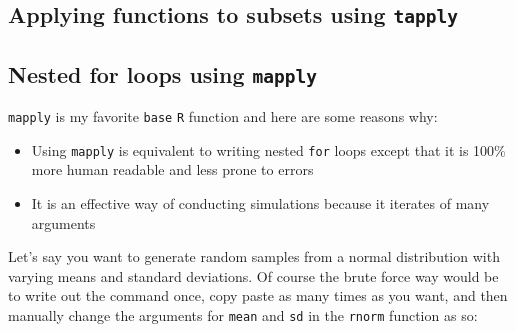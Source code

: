 \documentclass[]{book}
\makeatletter
\newenvironment{Shaded}{\begin{snugshade}}{\end{snugshade}}
\newcommand{\KeywordTok}[1]{\textcolor[rgb]{0.13,0.29,0.53}{\textbf{#1}}}
\newcommand{\CommentTok}[1]{\textcolor[rgb]{0.56,0.35,0.01}{\textit{#1}}}
\newcommand{\OperatorTok}[1]{\textcolor[rgb]{0.81,0.36,0.00}{\textbf{#1}}}
\newcommand{\NormalTok}[1]{#1}
\providecommand{\tightlist}{%
  \setlength{\itemsep}{0pt}\setlength{\parskip}{0pt}}
\providecommand{\tightlist}{%
  \setlength{\itemsep}{0pt}\setlength{\parskip}{0pt}}
\newenvironment{kframe}{%
\medskip{}
\setlength{\fboxsep}{.8em}
 \def\at@end@of@kframe{}%
 \ifinner\ifhmode%
  \def\at@end@of@kframe{\end{minipage}}%
  \begin{minipage}{\columnwidth}%
 \fi\fi%
 \def\FrameCommand##1{\hskip\@totalleftmargin \hskip-\fboxsep
 \colorbox{shadecolor}{##1}\hskip-\fboxsep
     \hskip-\linewidth \hskip-\@totalleftmargin \hskip\columnwidth}%
 \MakeFramed {\advance\hsize-\width
   \@totalleftmargin\z@ \linewidth\hsize
   \@setminipage}}%
 {\par\unskip\endMakeFramed%
 \at@end@of@kframe}
\renewenvironment{Shaded}{\begin{kframe}}{\end{kframe}}
\makeatother
\begin{document}
\subsection{\texorpdfstring{Applying functions to subsets using
\texttt{tapply}}{Applying functions to subsets using tapply}}\label{applying-functions-to-subsets-using-tapply}

\begin{Shaded}
\end{Shaded}

\subsection{\texorpdfstring{Nested for loops using
\texttt{mapply}}{Nested for loops using mapply}}\label{nested-for-loops-using-mapply}

\texttt{mapply} is my favorite \texttt{base} \texttt{R} function and
here are some reasons why:

\begin{itemize}
\tightlist
\item
  Using \texttt{mapply} is equivalent to writing nested \texttt{for}
  loops except that it is 100\% more human readable and less prone to
  errors
\item
  It is an effective way of conducting simulations because it iterates
  of many arguments
\end{itemize}

Let's say you want to generate random samples from a normal distribution
with varying means and standard deviations. Of course the brute force
way would be to write out the command once, copy paste as many times as
you want, and then manually change the arguments for \texttt{mean} and
\texttt{sd} in the \texttt{rnorm} function as so:
\end{document}

